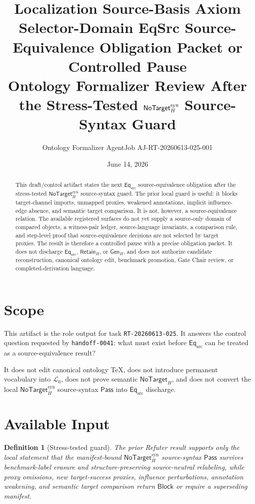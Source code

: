 \documentclass[11pt]{article}
\title{\textbf{Localization Source-Basis Axiom Selector-Domain EqSrc Source-Equivalence Obligation Packet or Controlled Pause}\\[0.35em]
\large Ontology Formalizer Review After the Stress-Tested \(\NoTargetSyn\) Source-Syntax Guard}
\author{Ontology Formalizer AgentJob AJ-RT-20260613-025-001}
\date{June 14, 2026}
\newcommand{\Lang}{\mathcal{L}_{0}}
\newcommand{\EqSrc}{\mathsf{Eq}_{\mathrm{src}}}
\newcommand{\GenH}{\mathsf{Gen}_{H}}
\newcommand{\RetainH}{\mathsf{Retain}_{H}}
\newcommand{\NoTargetH}{\mathsf{NoTarget}_{H}}
\newcommand{\NoTargetSyn}{\mathsf{NoTarget}_{H}^{\mathrm{syn}}}
\newcommand{\Pass}{\mathsf{Pass}}
\newcommand{\Block}{\mathsf{Block}}
\newtheorem{definitionblock}{Definition}
\begin{document}
\maketitle

\begin{abstract}
This draft/control artifact states the next \(\EqSrc\)
source-equivalence obligation after the stress-tested
\(\NoTargetSyn\) source-syntax guard. The prior local guard is useful:
it blocks target-channel imports, unmapped proxies, weakened annotations,
implicit influence-edge absence, and semantic target comparison. It is not,
however, a source-equivalence relation. The available registered surfaces do
not yet supply a source-only domain of compared objects, a witness-pair
ledger, source-language invariants, a comparison rule, and step-level
proof that source-equivalence decisions are not selected by target proxies.
The result is therefore a controlled pause with a precise obligation packet.
It does not discharge \(\EqSrc\), \(\RetainH\), or \(\GenH\), and does not
authorize candidate reconstruction, canonical ontology edit, benchmark
promotion, Gate Chair review, or completed-derivation language.
\end{abstract}

\section{Scope}

This artifact is the role output for task \texttt{RT-20260613-025}. It
answers the control question requested by \texttt{handoff-0041}: what must
exist before \(\EqSrc\) can be treated as a source-equivalence result?

It does not edit canonical ontology TeX, does not introduce permanent
vocabulary into \(\Lang\), does not prove semantic \(\NoTargetH\), and does
not convert the local \(\NoTargetSyn\) source-syntax \(\Pass\) into
\(\EqSrc\) discharge.

\section{Available Input}

\begin{definitionblock}[Stress-tested guard]
The prior Refuter result supports only the local statement that the
manifest-bound \(\NoTargetSyn\) source-syntax \(\Pass\) survives
benchmark-label erasure and structure-preserving source-neutral relabeling,
while proxy omissions, new target-success proxies, influence perturbations,
annotation weakening, and semantic target comparison return \(\Block\) or
require a superseding manifest.
\end{definitionblock}
\end{document}
